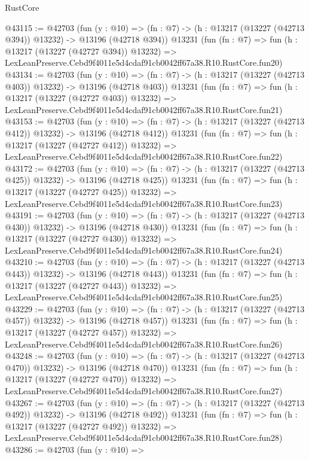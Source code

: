 \begin{lexlean}{RustCore}
\begin{coremodule}
@43115 := @42703
    (fun (y : @10) =>
    (fn : @7) -> (h : @13217 (@13227 (@42713 @394)) @13232) -> @13196 (@42718 @394))
    @13231
    (fun (fn : @7) =>
    fun (h : @13217 (@13227 (@42727 @394)) @13232) =>
    LexLeanPreserve.Cebd9f4011e5d4cdaf91cb0042ff67a38.R10.RustCore.fun20)
@43134 := @42703
    (fun (y : @10) =>
    (fn : @7) -> (h : @13217 (@13227 (@42713 @403)) @13232) -> @13196 (@42718 @403))
    @13231
    (fun (fn : @7) =>
    fun (h : @13217 (@13227 (@42727 @403)) @13232) =>
    LexLeanPreserve.Cebd9f4011e5d4cdaf91cb0042ff67a38.R10.RustCore.fun21)
@43153 := @42703
    (fun (y : @10) =>
    (fn : @7) -> (h : @13217 (@13227 (@42713 @412)) @13232) -> @13196 (@42718 @412))
    @13231
    (fun (fn : @7) =>
    fun (h : @13217 (@13227 (@42727 @412)) @13232) =>
    LexLeanPreserve.Cebd9f4011e5d4cdaf91cb0042ff67a38.R10.RustCore.fun22)
@43172 := @42703
    (fun (y : @10) =>
    (fn : @7) -> (h : @13217 (@13227 (@42713 @425)) @13232) -> @13196 (@42718 @425))
    @13231
    (fun (fn : @7) =>
    fun (h : @13217 (@13227 (@42727 @425)) @13232) =>
    LexLeanPreserve.Cebd9f4011e5d4cdaf91cb0042ff67a38.R10.RustCore.fun23)
@43191 := @42703
    (fun (y : @10) =>
    (fn : @7) -> (h : @13217 (@13227 (@42713 @430)) @13232) -> @13196 (@42718 @430))
    @13231
    (fun (fn : @7) =>
    fun (h : @13217 (@13227 (@42727 @430)) @13232) =>
    LexLeanPreserve.Cebd9f4011e5d4cdaf91cb0042ff67a38.R10.RustCore.fun24)
@43210 := @42703
    (fun (y : @10) =>
    (fn : @7) -> (h : @13217 (@13227 (@42713 @443)) @13232) -> @13196 (@42718 @443))
    @13231
    (fun (fn : @7) =>
    fun (h : @13217 (@13227 (@42727 @443)) @13232) =>
    LexLeanPreserve.Cebd9f4011e5d4cdaf91cb0042ff67a38.R10.RustCore.fun25)
@43229 := @42703
    (fun (y : @10) =>
    (fn : @7) -> (h : @13217 (@13227 (@42713 @457)) @13232) -> @13196 (@42718 @457))
    @13231
    (fun (fn : @7) =>
    fun (h : @13217 (@13227 (@42727 @457)) @13232) =>
    LexLeanPreserve.Cebd9f4011e5d4cdaf91cb0042ff67a38.R10.RustCore.fun26)
@43248 := @42703
    (fun (y : @10) =>
    (fn : @7) -> (h : @13217 (@13227 (@42713 @470)) @13232) -> @13196 (@42718 @470))
    @13231
    (fun (fn : @7) =>
    fun (h : @13217 (@13227 (@42727 @470)) @13232) =>
    LexLeanPreserve.Cebd9f4011e5d4cdaf91cb0042ff67a38.R10.RustCore.fun27)
@43267 := @42703
    (fun (y : @10) =>
    (fn : @7) -> (h : @13217 (@13227 (@42713 @492)) @13232) -> @13196 (@42718 @492))
    @13231
    (fun (fn : @7) =>
    fun (h : @13217 (@13227 (@42727 @492)) @13232) =>
    LexLeanPreserve.Cebd9f4011e5d4cdaf91cb0042ff67a38.R10.RustCore.fun28)
@43286 := @42703
    (fun (y : @10) =>

\end{coremodule}
\end{lexlean}
